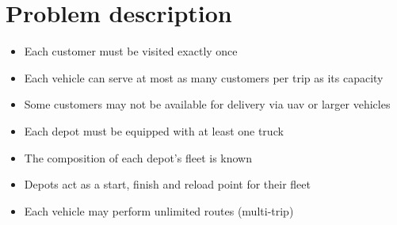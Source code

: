 \documentclass{article}
\begin{document}
	\section{Problem description}
	\begin{itemize}
		\item Each customer must be visited exactly once
		\item Each vehicle can serve at most as many customers per trip as its capacity
		\item Some customers may not be available for delivery via uav or larger vehicles
		\item Each depot must be equipped with at least one truck
		\item The composition of each depot's fleet is known
		\item Depots act as a start, finish and reload point for their fleet
		\item Each vehicle may perform unlimited routes (multi-trip)
	\end{itemize}
	
\end{document}
